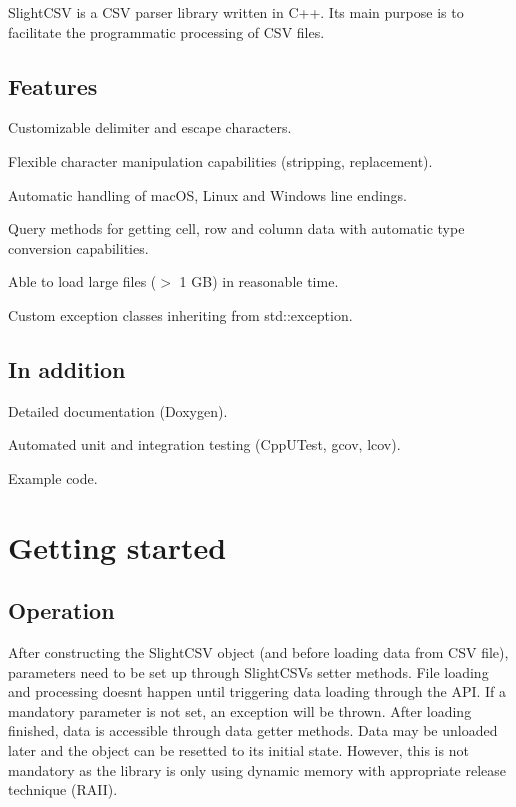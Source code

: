 Slight\+C\+SV is a C\+SV parser library written in C++. Its main purpose is to facilitate the programmatic processing of C\+SV files.

\subsection*{Features}


\begin{DoxyItemize}
\item Customizable delimiter and escape characters.
\item Flexible character manipulation capabilities (stripping, replacement).
\item Automatic handling of mac\+OS, Linux and Windows line endings.
\item Query methods for getting cell, row and column data with automatic type conversion capabilities.
\item Able to load large files ($>$ 1 GB) in reasonable time.
\item Custom exception classes inheriting from std\+::exception.
\end{DoxyItemize}

\subsection*{In addition}


\begin{DoxyItemize}
\item Detailed documentation (Doxygen).
\item Automated unit and integration testing (Cpp\+U\+Test, gcov, lcov).
\item Example code.
\end{DoxyItemize}

\section*{Getting started}

\subsection*{Operation}

After constructing the Slight\+C\+SV object (and before loading data from C\+SV file), parameters need to be set up through Slight\+C\+SV\textquotesingle{}s setter methods. File loading and processing doesn\textquotesingle{}t happen until triggering data loading through the A\+PI. If a mandatory parameter is not set, an exception will be thrown. After loading finished, data is accessible through data getter methods. Data may be unloaded later and the object can be resetted to its initial state. However, this is not mandatory as the library is only using dynamic memory with appropriate release technique (R\+A\+II).

